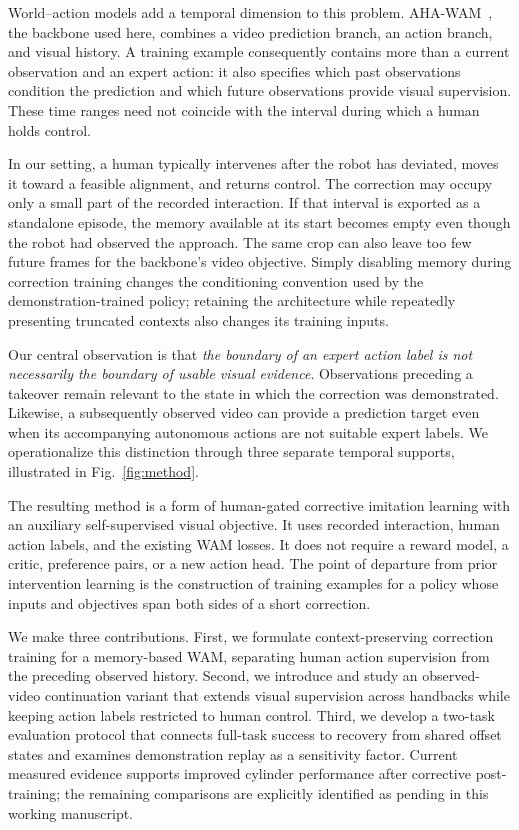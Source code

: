 \documentclass[letterpaper,10pt,conference]{ieeeconf}
\begin{document}
World--action models add a temporal dimension to this problem. AHA-WAM~\cite{ahawam}, the backbone used here, combines a video prediction branch, an action branch, and visual history. A training example consequently contains more than a current observation and an expert action: it also specifies which past observations condition the prediction and which future observations provide visual supervision. These time ranges need not coincide with the interval during which a human holds control.

In our setting, a human typically intervenes after the robot has deviated, moves it toward a feasible alignment, and returns control. The correction may occupy only a small part of the recorded interaction. If that interval is exported as a standalone episode, the memory available at its start becomes empty even though the robot had observed the approach. The same crop can also leave too few future frames for the backbone's video objective. Simply disabling memory during correction training changes the conditioning convention used by the demonstration-trained policy; retaining the architecture while repeatedly presenting truncated contexts also changes its training inputs.

Our central observation is that \emph{the boundary of an expert action label is not necessarily the boundary of usable visual evidence}. Observations preceding a takeover remain relevant to the state in which the correction was demonstrated. Likewise, a subsequently observed video can provide a prediction target even when its accompanying autonomous actions are not suitable expert labels. We operationalize this distinction through three separate temporal supports, illustrated in Fig.~\ref{fig:method}.

The resulting method is a form of human-gated corrective imitation learning with an auxiliary self-supervised visual objective. It uses recorded interaction, human action labels, and the existing WAM losses. It does not require a reward model, a critic, preference pairs, or a new action head. The point of departure from prior intervention learning is the construction of training examples for a policy whose inputs and objectives span both sides of a short correction.

We make three contributions. First, we formulate context-preserving correction training for a memory-based WAM, separating human action supervision from the preceding observed history. Second, we introduce and study an observed-video continuation variant that extends visual supervision across handbacks while keeping action labels restricted to human control. Third, we develop a two-task evaluation protocol that connects full-task success to recovery from shared offset states and examines demonstration replay as a sensitivity factor. Current measured evidence supports improved cylinder performance after corrective post-training; the remaining comparisons are explicitly identified as pending in this working manuscript.
\end{document}
